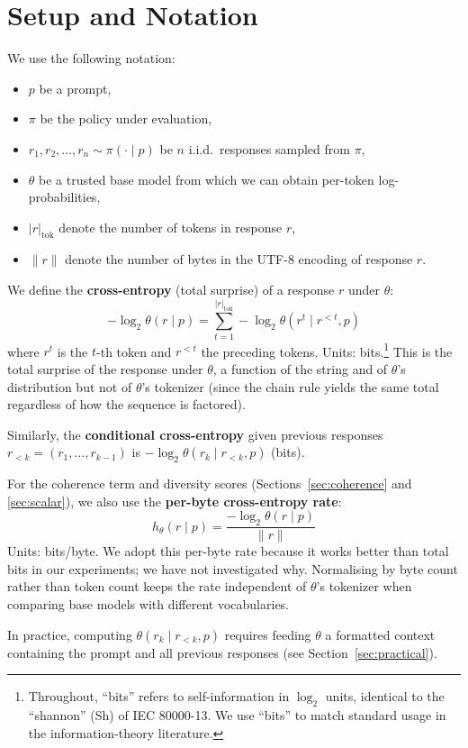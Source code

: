 \section{Setup and Notation}\label{sec:setup-notation}

We use the following notation:
\begin{itemize}[nosep]
    \item $p$ be a prompt,
    \item $\pi$ be the policy under evaluation,
    \item $r_1, r_2, \ldots, r_n \sim \pi(\cdot \mid p)$ be $n$ i.i.d.\ responses sampled from $\pi$,
    \item $\theta$ be a trusted base model from which we can obtain per-token log-probabilities,
    \item $|r|_{\mathrm{tok}}$ denote the number of tokens in response $r$,
    \item $\|r\|$ denote the number of bytes in the UTF-8 encoding of response $r$.
\end{itemize}

We define the \textbf{cross-entropy} (total surprise) of a response $r$ under $\theta$:
\begin{equation}\label{eq:total-xent}
    -\log_2 \theta(r \mid p) = \sum_{t=1}^{|r|_{\mathrm{tok}}} -\log_2 \theta(r^t \mid r^{<t}, p)
\end{equation}
where $r^t$ is the $t$-th token and $r^{<t}$ the preceding tokens.
Units: bits.\footnote{Throughout, ``bits'' refers to self-information in $\log_2$ units, identical to the ``shannon'' (Sh) of IEC 80000-13.
We use ``bits'' to match standard usage in the information-theory literature.} This is the total surprise of the response under $\theta$, a function of the string and of $\theta$'s distribution but not of $\theta$'s tokenizer (since the chain rule yields the same total regardless of how the sequence is factored).

Similarly, the \textbf{conditional cross-entropy} given previous responses $r_{<k} = (r_1, \ldots, r_{k-1})$ is $-\log_2 \theta(r_k \mid r_{<k}, p)$ (bits).

For the coherence term and diversity scores (Sections~\ref{sec:coherence} and \ref{sec:scalar}), we also use the \textbf{per-byte cross-entropy rate}:
\begin{equation}\label{eq:pertok}
    h_\theta(r \mid p) = \frac{-\log_2 \theta(r \mid p)}{\|r\|}
\end{equation}
Units: bits/byte.
We adopt this per-byte rate because it works better than total bits in our experiments; we have not investigated why.
Normalising by byte count rather than token count keeps the rate independent of $\theta$'s tokenizer when comparing base models with different vocabularies.

In practice, computing $\theta(r_k \mid r_{<k}, p)$ requires feeding $\theta$ a formatted context containing the prompt and all previous responses (see Section~\ref{sec:practical}).

